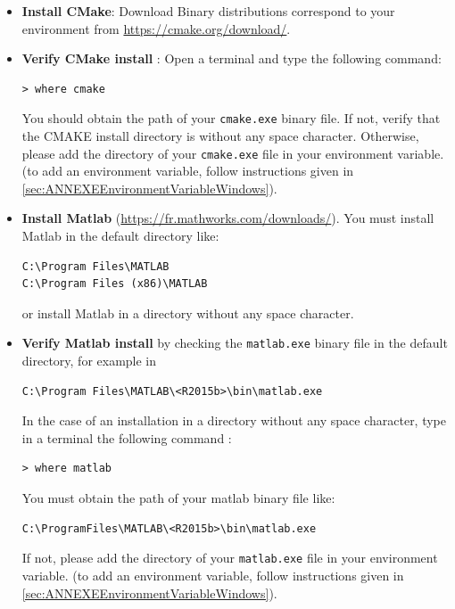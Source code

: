 \begin{itemize}
\item \textbf{Install CMake}: Download Binary distributions correspond to your environment from \url{https://cmake.org/download/}.
\item \textbf{Verify CMake install} : Open a terminal and type the following command:
\begin{lstlisting}
> where cmake
\end{lstlisting}
You should obtain the path of your \texttt{cmake.exe} binary file. If not, verify that the CMAKE install directory is without any space character. Otherwise, please add the directory of your \texttt{cmake.exe} file in your environment variable. (to add an environment variable, follow instructions given in \ref{sec:ANNEXEEnvironmentVariableWindows}). 

\item \textbf{Install Matlab} (\url{https://fr.mathworks.com/downloads/}). You must install Matlab in the default directory like:
\begin{lstlisting}[backgroundcolor=\color{white}] 
C:\Program Files\MATLAB
C:\Program Files (x86)\MATLAB
\end{lstlisting}
or install Matlab in a directory without any space character.

\item \textbf{Verify Matlab install} by checking the \texttt{matlab.exe} binary file in the default directory, for example in  
\begin{lstlisting}[backgroundcolor=\color{white}]
C:\Program Files\MATLAB\<R2015b>\bin\matlab.exe
\end{lstlisting}
In the case of an installation in a directory without any space character, type in a terminal the following command : 
\begin{lstlisting}
> where matlab
\end{lstlisting}
You must obtain the path of your matlab binary file like: 
\begin{lstlisting}[backgroundcolor=\color{white}]
C:\ProgramFiles\MATLAB\<R2015b>\bin\matlab.exe
\end{lstlisting}
If not, please add the directory of your \texttt{matlab.exe} file in your environment variable. (to add an environment variable, follow instructions given in \ref{sec:ANNEXEEnvironmentVariableWindows}). 



\end{itemize}
